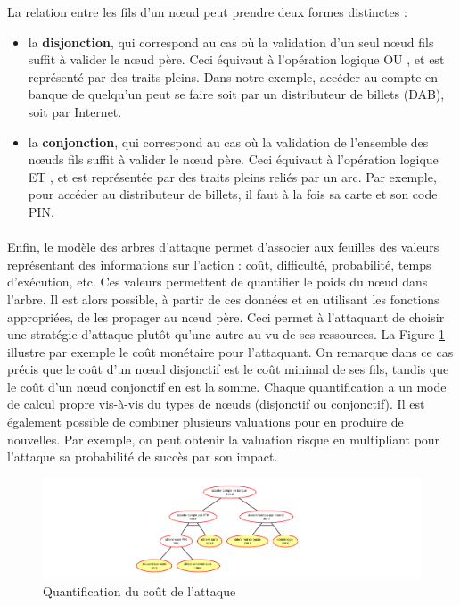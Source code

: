         La relation entre les fils d'un nœud peut prendre deux formes distinctes :
        \begin{itemize}
        \item la {\bf disjonction}, qui correspond au cas où la validation d'un seul nœud fils suffit à valider le nœud père. Ceci équivaut à l'opération logique \og OU \fg{}, et est représenté par des traits pleins. Dans notre exemple, accéder au compte en banque de quelqu'un peut se faire soit par un distributeur de billets (DAB), soit par Internet.
        
        \item la {\bf conjonction}, qui correspond au cas où la validation de l'ensemble des nœuds fils suffit à valider le nœud père. Ceci équivaut à l'opération logique \og ET \fg{}, et est représentée par des traits pleins reliés par un arc. Par exemple, pour accéder au distributeur de billets, il faut à la fois sa carte et son code PIN.
         \end{itemize}

	\paragraph{}
        Enfin, le modèle des arbres d'attaque permet d'associer aux feuilles des valeurs représentant des informations sur l'action : coût, difficulté, probabilité, temps d'exécution, etc. Ces valeurs permettent de quantifier le poids du nœud dans l'arbre. Il est alors possible, à partir de ces données et en utilisant les fonctions appropriées, de les propager au nœud père. Ceci permet à l'attaquant de choisir une stratégie d'attaque plutôt qu'une autre au vu de ses ressources. La Figure \ref{fig:arbre_exemple_2} illustre par exemple le coût monétaire pour l'attaquant. On remarque dans ce cas précis que le coût d'un nœud disjonctif est le coût minimal de ses fils, tandis que le coût d'un nœud conjonctif en est la somme. Chaque quantification a un mode de calcul propre vis-à-vis du types de nœuds (disjonctif ou conjonctif). Il est également possible de combiner plusieurs valuations pour en produire de nouvelles. Par exemple, on peut obtenir la valuation \og risque \fg{}  en multipliant pour l'attaque sa \og probabilité de succès\fg{} par son \og impact\fg{}.

        \begin{figure}[htbp]
        \centering
        \includegraphics[width=\textwidth]{figure/quantification.pdf}%
        \caption{Quantification du coût de l'attaque}
        \label{fig:arbre_exemple_2}
        \end{figure}

